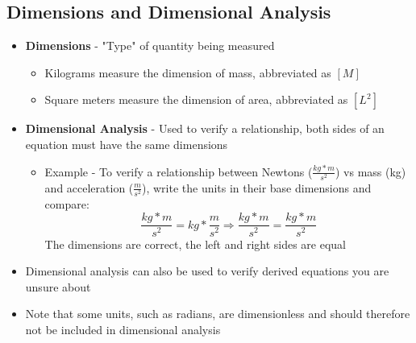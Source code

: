 \subsection{Dimensions and Dimensional Analysis}
    \begin{itemize}
        \item \textbf{Dimensions} - "Type" of quantity being measured 
        \begin{itemize}
            \item Kilograms measure the dimension of mass, abbreviated as \([M]\)
            \item Square meters measure the dimension of area, abbreviated as \([L^2]\)
        \end{itemize}
        \item \textbf{Dimensional Analysis} - Used to verify a relationship, both sides of an equation must have the same dimensions
        \begin{itemize}
            \item Example - To verify a relationship between Newtons ($\frac{kg*m}{s^2}$) vs mass (kg) and acceleration ($\frac{m}{s^2}$), write the units in their base dimensions and compare:
            \[\frac{kg*m}{s^2}=kg*\frac{m}{s^2}\Rightarrow\frac{kg*m}{s^2}=\frac{kg*m}{s^2}\]
            The dimensions are correct, the left and right sides are equal
        \end{itemize}
        \item Dimensional analysis can also be used to verify derived equations you are unsure about
        \item Note that some units, such as radians, are dimensionless and should therefore not be included in dimensional analysis
    \end{itemize}
	
\newpage